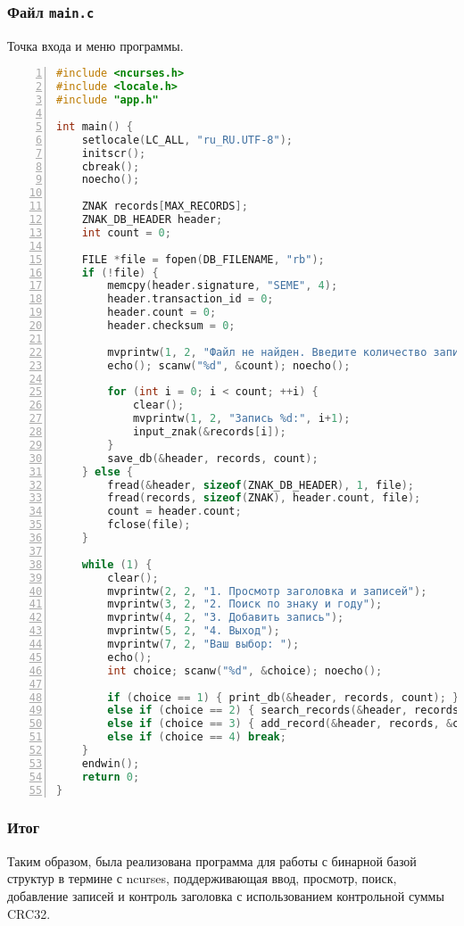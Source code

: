\subsubsection*{Файл \texttt{main.c}}

Точка входа и меню программы.

\begin{lstlisting}[language=C, numbers=left, caption=main.c]
#include <ncurses.h>
#include <locale.h>
#include "app.h"

int main() {
    setlocale(LC_ALL, "ru_RU.UTF-8");
    initscr();
    cbreak();
    noecho();

    ZNAK records[MAX_RECORDS];
    ZNAK_DB_HEADER header;
    int count = 0;

    FILE *file = fopen(DB_FILENAME, "rb");
    if (!file) {
        memcpy(header.signature, "SEME", 4);
        header.transaction_id = 0;
        header.count = 0;
        header.checksum = 0;

        mvprintw(1, 2, "Файл не найден. Введите количество записей: ");
        echo(); scanw("%d", &count); noecho();

        for (int i = 0; i < count; ++i) {
            clear();
            mvprintw(1, 2, "Запись %d:", i+1);
            input_znak(&records[i]);
        }
        save_db(&header, records, count);
    } else {
        fread(&header, sizeof(ZNAK_DB_HEADER), 1, file);
        fread(records, sizeof(ZNAK), header.count, file);
        count = header.count;
        fclose(file);
    }

    while (1) {
        clear();
        mvprintw(2, 2, "1. Просмотр заголовка и записей");
        mvprintw(3, 2, "2. Поиск по знаку и году");
        mvprintw(4, 2, "3. Добавить запись");
        mvprintw(5, 2, "4. Выход");
        mvprintw(7, 2, "Ваш выбор: ");
        echo();
        int choice; scanw("%d", &choice); noecho();

        if (choice == 1) { print_db(&header, records, count); }
        else if (choice == 2) { search_records(&header, records, count); }
        else if (choice == 3) { add_record(&header, records, &count); }
        else if (choice == 4) break;
    }
    endwin();
    return 0;
}
\end{lstlisting}

\subsubsection*{Итог}

Таким образом, была реализована программа для работы с бинарной базой структур в термине с ncurses, поддерживающая ввод, просмотр, поиск, добавление записей и контроль заголовка с использованием контрольной суммы CRC32. 

